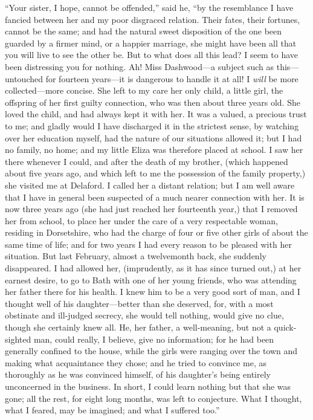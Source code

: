 \documentclass{article}
\begin{document}
``Your sister, I hope, cannot be offended,'' said he,
``by the resemblance I have fancied between her and my
poor disgraced relation.  Their fates, their fortunes,
cannot be the same; and had the natural sweet
disposition of the one been guarded by a firmer mind,
or a happier marriage, she might have been all that you
will live to see the other be.  But to what does all this
lead?  I seem to have been distressing you for nothing.
Ah! Miss Dashwood---a subject such as this---untouched
for fourteen years---it is dangerous to handle it at all!
I \emph{will} be more collected---more concise.  She left to my care
her only child, a little girl, the offspring of her first
guilty connection, who was then about three years old.
She loved the child, and had always kept it with her.
It was a valued, a precious trust to me; and gladly
would I have discharged it in the strictest sense,
by watching over her education myself, had the nature
of our situations allowed it; but I had no family, no home;
and my little Eliza was therefore placed at school.
I saw her there whenever I could, and after the death of my
brother, (which happened about five years ago, and which
left to me the possession of the family property,) she
visited me at Delaford.  I called her a distant relation;
but I am well aware that I have in general been suspected
of a much nearer connection with her.  It is now three
years ago (she had just reached her fourteenth year,)
that I removed her from school, to place her under the care
of a very respectable woman, residing in Dorsetshire,
who had the charge of four or five other girls of about
the same time of life; and for two years I had every reason
to be pleased with her situation.  But last February,
almost a twelvemonth back, she suddenly disappeared.
I had allowed her, (imprudently, as it has since turned
out,) at her earnest desire, to go to Bath with one of
her young friends, who was attending her father there
for his health.  I knew him to be a very good sort of man,
and I thought well of his daughter---better than she deserved,
for, with a most obstinate and ill-judged secrecy,
she would tell nothing, would give no clue, though she
certainly knew all.  He, her father, a well-meaning,
but not a quick-sighted man, could really, I believe,
give no information; for he had been generally confined
to the house, while the girls were ranging over the town
and making what acquaintance they chose; and he tried
to convince me, as thoroughly as he was convinced himself,
of his daughter's being entirely unconcerned in the business.
In short, I could learn nothing but that she was gone;
all the rest, for eight long months, was left to conjecture.
What I thought, what I feared, may be imagined; and what I
suffered too.''
\end{document}

